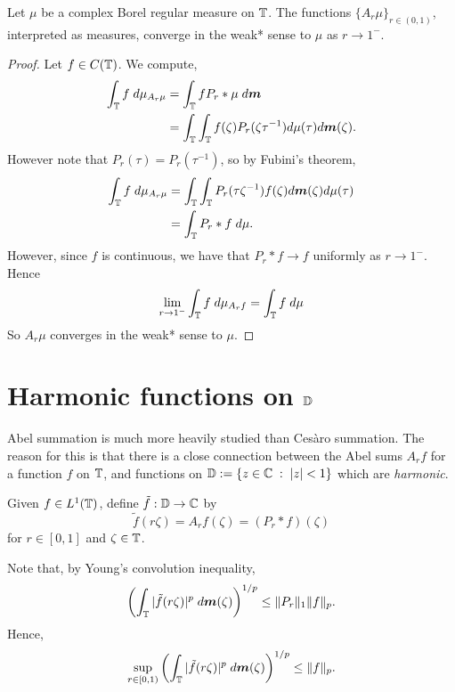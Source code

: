 \begin{proposition}
    Let $\mu$ be a complex Borel regular measure on $\mathbb{T}$. The functions $\{A_r \mu\}_{r \in (0,1)}$,
    interpreted as measures, converge in the weak* sense to $\mu$ as $r\rightarrow 1^-$.
\end{proposition}
\begin{proof}
    Let $f \in C(\mathbb{T})$. We compute,
    \begin{align*}
        \int_{\mathbb{T}} f\;d\mu_{A_r\mu} &= \int_{\mathbb{T}} fP_r*\mu\;d\boldsymbol{m}\\
        &= \int_{\mathbb{T}}\int_{\mathbb{T}} f(\zeta) P_r(\zeta\tau^{-1}) d\mu(\tau)d\boldsymbol{m}(\zeta).
    \end{align*}
    However note that $P_r(\tau) = P_r(\tau^{-1})$, so by Fubini's theorem,
    \begin{align*}
        \int_{\mathbb{T}} f\;d\mu_{A_r \mu} &= \int_{\mathbb{T}} \int_{\mathbb{T}} P_r(\tau\zeta^{-1})f(\zeta)d\boldsymbol{m}(\zeta)d\mu(\tau)\\
        &= \int_{\mathbb{T}} P_r*f \;d\mu.
    \end{align*}
    However, since $f$ is continuous, we have that $P_r*f\rightarrow f$ uniformly
    as $r\rightarrow 1^-$. Hence
    \begin{equation*}
        \lim_{r\rightarrow 1^-} \int_{\mathbb{T}} f\;d\mu_{A_rf} = \int_{\mathbb{T}} f\;d\mu
    \end{equation*}
    So $A_r\mu$ converges in the weak* sense to $\mu$.
\end{proof}

\section{Harmonic functions on $\mathbb{D}$}
Abel summation is much more heavily studied than Ces\`aro summation. The reason
for this is that there is a close connection between the Abel sums $A_r f$
for a function $f$ on $\mathbb{T}$, and functions on $\mathbb{D} := \{ z \in \mathbb{C}\;:\; |z| < 1\}$
which are \emph{harmonic}.

Given $f \in L^1(\mathbb{T})$, define $\tilde{f}:\mathbb{D}\rightarrow\mathbb{C}$
by
\begin{equation*}
    \tilde{f}(r\zeta) = A_rf(\zeta) = (P_r*f)(\zeta)
\end{equation*}
for $r \in [0,1]$ and $\zeta \in \mathbb{T}$.

Note that, by Young's convolution inequality,
\begin{equation*}
    \left(\int_{\mathbb{T}} |\tilde{f}(r\zeta)|^p\;d\boldsymbol{m}(\zeta)\right)^{1/p} \leq \|P_r\|_1 \|f\|_{p}.
\end{equation*}
Hence,
\begin{equation*}
    \sup_{r \in [0,1)} \left(\int_{\mathbb{T}} |\tilde{f}(r\zeta)|^p\;d\boldsymbol{m}(\zeta)\right)^{1/p} \leq \|f\|_p.
\end{equation*} 

